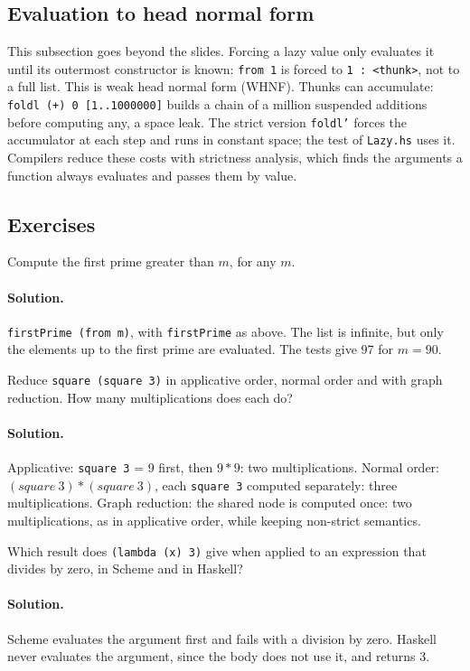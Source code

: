 \subsection{Evaluation to head normal form}

This subsection goes beyond the slides. Forcing a lazy value only evaluates
it until its outermost constructor is known: \texttt{from 1} is forced to
\texttt{1 : <thunk>}, not to a full list. This is weak head normal form
(WHNF). Thunks can accumulate: \texttt{foldl (+) 0 [1..1000000]} builds a chain
of a million suspended additions before computing any, a space leak. The
strict version \texttt{foldl'} forces the accumulator at each step and runs in
constant space; the test of \texttt{Lazy.hs} uses it. Compilers reduce these
costs with strictness analysis, which finds the arguments a function always
evaluates and passes them by value.

\subsection{Exercises}

\begin{exercise}
Compute the first prime greater than $m$, for any $m$.
\end{exercise}

\paragraph{Solution.} \texttt{firstPrime (from m)}, with \texttt{firstPrime} as above.
The list is infinite, but only the elements up to the first prime are
evaluated. The tests give 97 for $m = 90$.

\begin{exercise}
Reduce \texttt{square (square 3)} in applicative order, normal order and with
graph reduction. How many multiplications does each do?
\end{exercise}

\paragraph{Solution.} Applicative: \texttt{square 3} = 9 first, then $9 * 9$: two
multiplications. Normal order: $(\mathit{square}\ 3) * (\mathit{square}\ 3)$, each
\texttt{square 3} computed separately: three multiplications. Graph
reduction: the shared node is computed once: two multiplications, as in
applicative order, while keeping non-strict semantics.

\begin{exercise}
Which result does \texttt{(lambda (x) 3)} give when applied to an expression
that divides by zero, in Scheme and in Haskell?
\end{exercise}

\paragraph{Solution.} Scheme evaluates the argument first and fails with a
division by zero. Haskell never evaluates the argument, since the body does
not use it, and returns 3.
